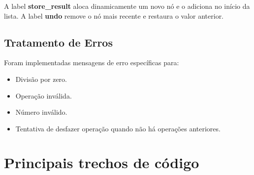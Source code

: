 \documentclass[12pt]{article}
\begin{document}
A label \textbf{store\_result} aloca dinamicamente um novo nó e o
adiciona no início da lista. A label \textbf{undo} remove o nó
mais recente e restaura o valor anterior.

\subsection{Tratamento de Erros}
Foram implementadas mensagens de erro específicas para:
\begin{itemize}
	\item Divisão por zero.
	\item Operação inválida.
	\item Número inválido.
	\item Tentativa de desfazer operação quando não há operações anteriores.
\end{itemize}

\section{Principais trechos de código}
\end{document}
